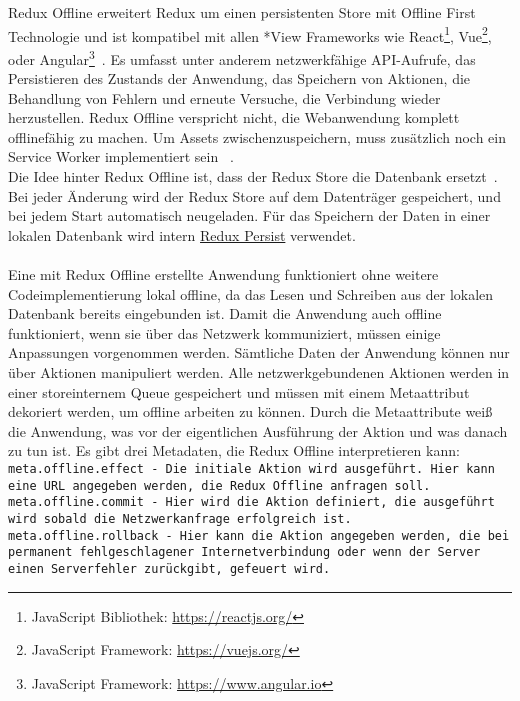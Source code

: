 % 
% 
Redux Offline erweitert Redux um einen persistenten Store mit Offline First Technologie und ist kompatibel mit allen *View Frameworks wie React\footnote{JavaScript Bibliothek: \url{https://reactjs.org/}}, Vue\footnote{JavaScript Framework: \url{https://vuejs.org/}}, oder Angular\footnote{JavaScript Framework: \url{https://www.angular.io}}~\cite{redux-offline-compabilaty}.
Es umfasst unter anderem netzwerkfähige \gls{API}-Aufrufe, das Persistieren des Zustands der Anwendung, das Speichern von Aktionen, die Behandlung von Fehlern und erneute Versuche, die Verbindung wieder herzustellen.
Redux Offline verspricht nicht, die Webanwendung komplett offlinefähig zu machen.
Um \gls{Assets} zwischenzuspeichern, muss zusätzlich noch ein Service Worker implementiert sein ~\cite{redux-offline-gh}.\\
Die Idee hinter Redux Offline ist, dass der Redux Store die Datenbank ersetzt~\cite{redux-offline}.
Bei jeder Änderung wird der Redux Store auf dem Datenträger gespeichert, und bei jedem Start automatisch neugeladen.
Für das Speichern der Daten in einer lokalen Datenbank wird intern \hyperref[sub:reduxpersist]{Redux Persist} verwendet.\\\\
%
%
Eine mit Redux Offline erstellte Anwendung funktioniert ohne weitere Codeimplementierung lokal offline, da das Lesen und Schreiben aus der lokalen Datenbank bereits eingebunden ist.
Damit die Anwendung auch offline funktioniert, wenn sie über das Netzwerk kommuniziert, müssen einige Anpassungen vorgenommen werden.
Sämtliche Daten der Anwendung können nur über Aktionen manipuliert werden. 
Alle netzwerkgebundenen Aktionen werden in einer storeinternem \gls{Queue} gespeichert und müssen mit einem Metaattribut dekoriert werden, um offline arbeiten zu können. Durch die Metaattribute weiß die Anwendung, was vor der eigentlichen Ausführung der Aktion und was danach zu tun ist. 
Es gibt drei Metadaten, die Redux Offline interpretieren kann:\\
\tt{meta.offline.effect} - Die initiale Aktion wird ausgeführt. Hier kann eine URL angegeben werden, die Redux Offline anfragen soll.\\
\tt{meta.offline.commit} - Hier wird die Aktion definiert, die ausgeführt wird sobald die Netzwerkanfrage erfolgreich ist.\\
\tt{meta.offline.rollback} - Hier kann die Aktion angegeben werden, die bei permanent fehlgeschlagener Internetverbindung oder wenn der Server einen Serverfehler zurückgibt, gefeuert wird.
